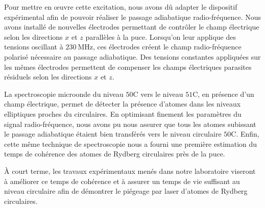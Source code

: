Pour mettre en \oe uvre cette excitation, nous avons dû adapter le dispositif expérimental afin de pouvoir réaliser le passage adiabatique radio-fréquence.
Nous avons installé de nouvelles électrodes permettant de contrôler le champ électrique selon les directions $x$ et $z$ parallèles à la puce.
Lorsqu'on leur applique des tensions oscillant à $\SI{230}{\MHz}$, ces électrodes créent le champ radio-fréquence polarisé nécessaire au passage adiabatique.
Des tensions constantes appliquées sur les mêmes électrodes permettent de compenser les champs électriques parasites résiduels selon les directions $x$ et $z$.

La spectroscopie microonde du niveau $\mathrm{50C}$ vers le niveau $\mathrm{51C}$, en présence d'un champ électrique, permet de détecter la présence d'atomes dans les niveaux elliptiques proches du circulaires.
En optimisant finement les paramètres du signal radio-fréquence, nous avons pu nous assurer que tous les atomes subissant le passage adiabatique étaient bien transférés vers le niveau circulaire $\mathrm{50C}$.
Enfin, cette même technique de spectroscopie nous a fourni une première estimation du temps de cohérence des atomes de Rydberg circulaires près de la puce.

\`A court terme, les travaux expérimentaux menés dans notre laboratoire viseront à améliorer ce temps de cohérence et à assurer un temps de vie suffisant au niveau circulaire afin de démontrer le piégeage par laser d'atomes de Rydberg circulaires.

